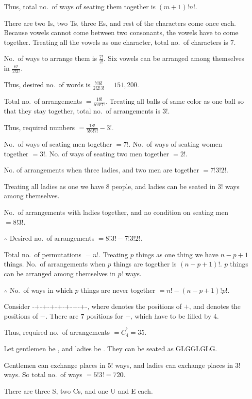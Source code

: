   Thus, total no.\  of ways of seating them together is $(m + 1)!n!$.
\item There are two I\symbol[rightquote]s, two T\symbol[rightquote]s, three E\symbol[rightquote]s, and rest
  of the characters come once each. Because vowels cannot come between two consonants, the vowels have to
  come together. Treating all the vowels as one character, total no.\ of characters is $7$.

  No.\ of ways to arrange them is $\frac{7!}{2!}$. Six vowels can be arranged among themselves in
  $\frac{6!}{2!3!}$.

  Thus, desired no.\ of words is $\frac{7!6!}{2!2!3!} = 151,200$.
\item Total no.\ of arrangements $= \frac{18!}{5!6!7!}$. Treating all balls of same color as one ball so that
  they stay together, total no.\ of arrangements is $3!$.

  Thus, required numbers $= \frac{18!}{5!6!7!} - 3!$.
\item No.\ of ways of seating men together $= 7!$. No.\ of ways of seating women together $= 3!$. No. of
  ways of seating two men together $= 2!$.

  No. of arrangements when three ladies, and two men are together $= 7!3!2!$.

  Treating all ladies as one we have $8$ people, and ladies can be seated in $3!$ ways among themselves.

  No.\ of arrangements with ladies together, and no condition on seating men $= 8!3!$.

  $\therefore$ Desired no.\ of arrangements $= 8!3! - 7!3!2!$.
\item Total no.\ of permutations $= n!$. Treating $p$ things as one thing we have $n - p + 1$ things. No.\
  of arrangements when $p$ things are together is $(n - p + 1)!$. $p$ things can be arranged among
  themselves in $p!$ ways.

  $\therefore$ No.\ of ways in which $p$ things are never together $= n! - (n - p + 1)!p!$.
\item Consider -+-+-+-+-+-+-+-, where \quote{+} denotes the positions of $+$, and \quote{-} denotes the
  positions of $-$. There are $7$ positions for $-$, which have to be filled by $4$.

  Thus, required no.\ of arrangements $= C_4^^7 = 35$.
\item Let gentlemen be , and ladies be . They can be seated as GLGGLGLG.

  Gentlemen can exchange places in $5!$ ways, and ladies can exchange places in $3!$ ways. So total no.\ of
  ways $= 5!3! = 720$.
\item There are three S\symbol[rightquote], two C\symbol[rightquote]s, and one U and E each.

